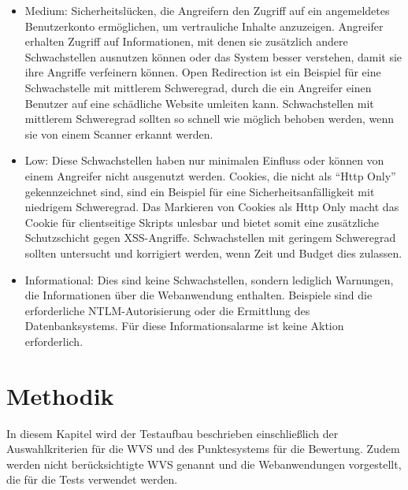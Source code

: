 \documentclass[12pt,oneside,a4paper,parskip,pointlessnumbers]{scrbook}
\begin{document}
\begin{itemize}
\begin{itemize}
      \item Medium: Sicherheitslücken, die Angreifern den Zugriff auf ein angemeldetes Benutzerkonto ermöglichen, um vertrauliche Inhalte anzuzeigen. Angreifer erhalten Zugriff auf Informationen, mit denen sie zusätzlich andere Schwachstellen ausnutzen können oder das System besser verstehen, damit sie ihre Angriffe verfeinern können. Open Redirection ist ein Beispiel für eine Schwachstelle mit mittlerem Schweregrad, durch die ein Angreifer einen Benutzer auf eine schädliche Website umleiten kann. Schwachstellen mit mittlerem Schweregrad sollten so schnell wie möglich behoben werden, wenn sie von einem Scanner erkannt werden.

      \item Low: Diese Schwachstellen haben nur minimalen Einfluss oder können von einem Angreifer nicht ausgenutzt werden. Cookies, die nicht als ``Http Only'' gekennzeichnet sind, sind ein Beispiel für eine Sicherheitsanfälligkeit mit niedrigem Schweregrad. Das Markieren von Cookies als Http Only macht das Cookie für clientseitige Skripts unlesbar und bietet somit eine zusätzliche Schutzschicht gegen XSS-Angriffe. Schwachstellen mit geringem Schweregrad sollten untersucht und korrigiert werden, wenn Zeit und Budget dies zulassen.

      \item Informational: Dies sind keine Schwachstellen, sondern lediglich Warnungen, die Informationen über die Webanwendung enthalten. Beispiele sind die erforderliche NTLM-Autorisierung oder die Ermittlung des Datenbanksystems. Für diese Informationsalarme ist keine Aktion erforderlich.
    \end{itemize}

  \end{itemize}



\chapter{Methodik}
In diesem Kapitel wird der Testaufbau beschrieben einschließlich der Auswahlkriterien für die WVS und des Punktesystems für die Bewertung. Zudem werden nicht berücksichtigte WVS genannt und die Webanwendungen vorgestellt, die für die Tests verwendet werden.
\end{document}
